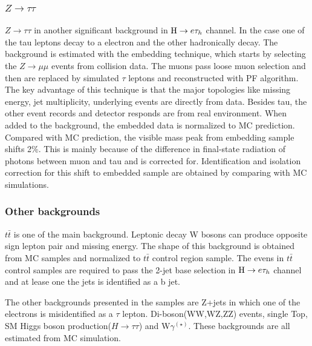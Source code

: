 \subsubsection{$Z \to \tau \tau$}
$Z \to \tau \tau$ in another significant background in $\mathrm{H} \to e \tau_{h}$ channel. In the case one of the tau leptons decay to a electron and the other hadronically decay. The background is estimated with the embedding technique\cite{Chatrchyan:2014nva}, which starts by selecting the $Z \to \mu\mu$ events from collision data. The muons pass loose muon selection and then are replaced by simulated $\tau$ leptons and reconstructed with PF algorithm. The key advantage of this technique is that the major topologies like missing energy, jet multiplicity, underlying events are directly from data. Besides tau, the other event records and detector responds are from real environment. When added to the background, the embedded data is normalized to MC prediction.  Compared with MC prediction, the visible mass peak from embedding sample shifts 2\%. This is mainly because of the difference in final-state radiation of photons between muon and tau and is corrected for. Identification and isolation correction for this shift to embedded sample are obtained by comparing with MC simulations.

\subsubsection{Other backgrounds}
$t\bar{t}$ is one of the main background. Leptonic decay W bosons can produce opposite sign lepton pair and missing energy. The shape of this background is obtained from MC samples and normalized to $t\bar{t}$ control region sample. The evens in  $t\bar{t}$ control samples are required to pass the 2-jet base selection in $\mathrm{H} \to e \tau_{h}$ channel and at lease one the jets is identified as a b jet. 

The other backgrounds presented in the samples are Z+jets in which one of the electrons is misidentified as a $\tau$ lepton. Di-boson(WW,WZ,ZZ) events, single Top, SM Higgs boson production($H \to \tau \tau$)  and W$\gamma^{(\star)}$. These backgrounds are all estimated from MC simulation. 









   



